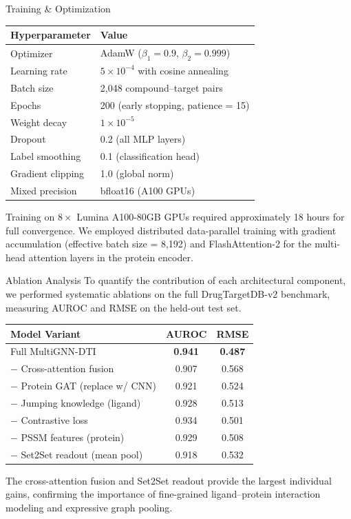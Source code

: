 \documentclass[20pt,landscape]{extarticle}
\begin{document}
\begin{minipage}[t]{0.325\textwidth}
\begin{posterblockteal}{Training \& Optimization}
\begin{tabularx}{\linewidth}{@{}lX@{}}
\toprule
\rule{0pt}{14pt}\textbf{Hyperparameter} & \textbf{Value} \\
\midrule
Optimizer & AdamW ($\beta_1 = 0.9$, $\beta_2 = 0.999$) \\
Learning rate & $5 \times 10^{-4}$ with cosine annealing \\
Batch size & 2,048 compound--target pairs \\
Epochs & 200 (early stopping, patience = 15) \\
Weight decay & $1 \times 10^{-5}$ \\
Dropout & 0.2 (all MLP layers) \\
Label smoothing & 0.1 (classification head) \\
Gradient clipping & 1.0 (global norm) \\
Mixed precision & bfloat16 (A100 GPUs) \\
\bottomrule
\end{tabularx}

\vspace{8pt}
Training on $8 \times$ Lumina A100-80GB GPUs required approximately 18 hours for full convergence.
We employed distributed data-parallel training with gradient accumulation (effective batch size = 8,192)
and FlashAttention-2 for the multi-head attention layers in the protein encoder.
\end{posterblockteal}

\begin{posterblock}{Ablation Analysis}
To quantify the contribution of each architectural component, we performed systematic ablations
on the full DrugTargetDB-v2 benchmark, measuring AUROC and RMSE on the held-out test set.

\begin{tabularx}{\linewidth}{@{}lcc@{}}
\toprule
\rule{0pt}{14pt}\textbf{Model Variant} & \textbf{AUROC} & \textbf{RMSE} \\
\midrule
Full MultiGNN-DTI & \textbf{0.941} & \textbf{0.487} \\
\rule{0pt}{12pt}$-$ Cross-attention fusion & 0.907 & 0.568 \\
$-$ Protein GAT (replace w/ CNN) & 0.921 & 0.524 \\
$-$ Jumping knowledge (ligand) & 0.928 & 0.513 \\
$-$ Contrastive loss & 0.934 & 0.501 \\
$-$ PSSM features (protein) & 0.929 & 0.508 \\
$-$ Set2Set readout (mean pool) & 0.918 & 0.532 \\
\bottomrule
\end{tabularx}

\vspace{8pt}
The cross-attention fusion and Set2Set readout provide the largest individual gains, confirming
the importance of fine-grained ligand--protein interaction modeling and expressive graph pooling.
\end{posterblock}

\end{minipage}%
\end{document}
